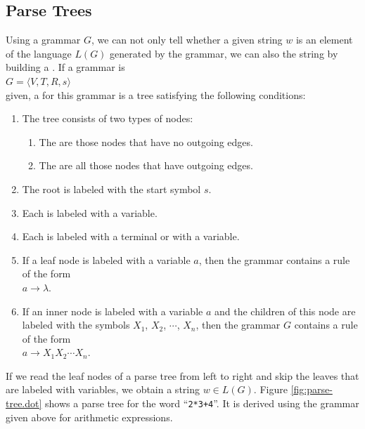 \subsection{Parse Trees}
Using a grammar $G$, we can not only tell whether a given string $w$ is an
element of the language $L(G)$ generated by the grammar, we can also  the string
by building a .  If a grammar is
\\[0.2cm]
\hspace*{1.3cm}
$G = \langle V, T, R, s \rangle$
\\[0.2cm]
given, a  for this grammar is a tree satisfying the following
conditions:
\begin{enumerate}
\item The tree consists of two types of nodes:
      \begin{enumerate}
      \item The  are those nodes that have no outgoing edges.
      \item The  are all those nodes that have outgoing edges.
      \end{enumerate}
\item The root is labeled with the start symbol $s$.
\item Each  is labeled with a variable.
\item Each  is labeled with a terminal or with a variable.
\item If a leaf node is labeled with a variable $a$, then the grammar contains a 
      rule of the form
      \\[0.2cm]
      \hspace*{1.3cm}
      $a \rightarrow \lambda$.
\item If an inner node is labeled with a variable $a$ and the children
      of this node are labeled with the symbols $X_1$, $X_2$, $\cdots$, $X_n$, then
      the grammar $G$ contains a rule of the form 
      \\[0.2cm]
      \hspace*{1.3cm}
      $a \rightarrow X_1 X_2 \cdots X_n$.
\end{enumerate}
If we read the leaf nodes of a parse tree from left to right and skip the leaves that are labeled with
variables, we obtain a string $w \in L(G)$.  Figure \ref{fig:parse-tree.dot} shows a
parse tree for the word ``\texttt{2*3+4}''.  It is derived using the grammar given above for
arithmetic expressions.

